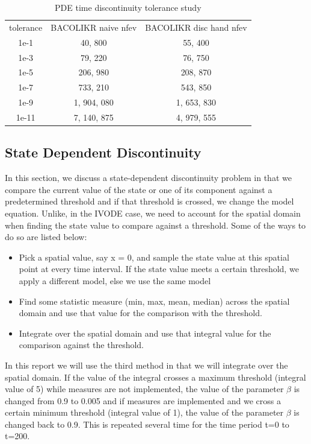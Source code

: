 \documentclass{article}
\begin{document}
\begin{table}[h]
\caption {PDE time discontinuity tolerance study} 
\label{tab:pde_time_nfev}
\begin{center}
\begin{tabular}{ c c c  } 
tolerance & BACOLIKR naive nfev & BACOLIKR disc hand nfev \\ 
1e-1      &   40, 800     &   55, 400   \\
1e-3      &   79, 220     &  76, 750    \\
1e-5      &  206, 980     &  208, 870    \\
1e-7      &  733, 210     &  543, 850     \\
1e-9      & 1, 904, 080     & 1, 653, 830   \\
1e-11     & 7, 140, 875     & 4, 979, 555   \\
\end{tabular}
\end{center}
\end{table} 



\subsection{State Dependent Discontinuity}
\label{subsection:pde_state_intro}
In this section, we discuss a state-dependent discontinuity problem in that we compare the current value of the state or one of its component against a predetermined threshold and if that threshold is crossed, we change the model equation. Unlike, in the IVODE case, we need to account for the spatial domain when finding the state value to compare against a threshold. Some of the ways to do so are listed below:
\begin{itemize}
\item Pick a spatial value, say x = 0, and sample the state value at this spatial point at every time interval. If the state value meets a certain threshold, we apply a different model, else we use the same model

\item Find some statistic measure (min, max, mean, median) across the spatial domain and use that value for the comparison with the threshold.

\item Integrate over the spatial domain and use that integral value for the comparison against the threshold.
\end{itemize}

In this report we will use the third method in that we will integrate over the spatial domain. If the value of the integral crosses a maximum threshold (integral value of 5) while measures are not implemented, the value of the parameter $\beta$ is changed from 0.9 to 0.005 and if measures are implemented and we cross a certain minimum threshold (integral value of 1), the value of the parameter $\beta$ is changed back to 0.9. This is repeated several time for the time period t=0 to t=200.  
\end{document}

